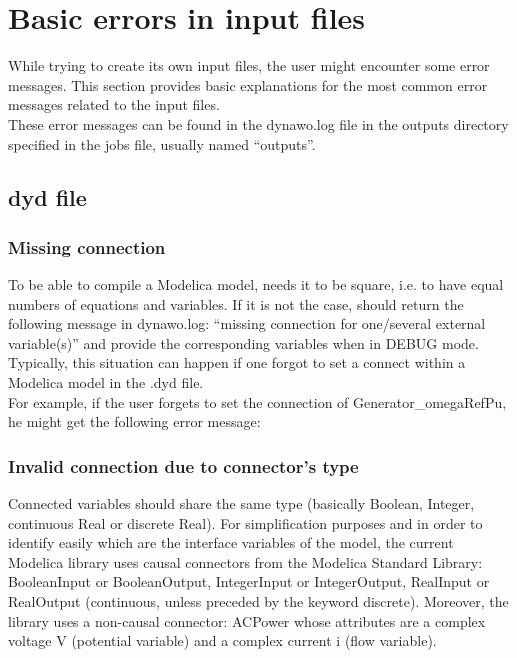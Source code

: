 \documentclass[a4paper, 12pt]{report}
\begin{document}
\section{Basic errors in input files}

While trying to create its own input files, the user might encounter some error messages. This section provides basic explanations for the most common error messages related to the input files. \\

These error messages can be found in the dynawo.log file in the outputs directory specified in the jobs file, usually named ``outputs''.

\subsection{dyd file}

\subsubsection{Missing connection}

To be able to compile a Modelica model, \Dynawo needs it to be square, i.e. to have equal numbers of equations and variables. If it is not the case, \Dynawo should return the following message in dynawo.log: ``missing connection for one/several external variable(s)'' and provide the corresponding variables when in DEBUG mode. Typically, this situation can happen if one forgot to set a connect within a Modelica model in the .dyd file. \\

For example, if the user forgets to set the connection of Generator\_omegaRefPu, he might get the following error message:



\subsubsection{Invalid connection due to connector's type}

Connected variables should share the same type (basically Boolean, Integer, continuous Real or discrete Real). For simplification purposes and in order to identify easily which are the interface variables of the model, the current \Dynawo Modelica library uses causal connectors from the Modelica Standard Library: BooleanInput or BooleanOutput, IntegerInput or IntegerOutput, RealInput or RealOutput (continuous, unless preceded by the keyword discrete). Moreover, the library uses a non-causal connector: ACPower whose attributes are a complex voltage V (potential variable) and a complex current i (flow variable). \\
\end{document}
